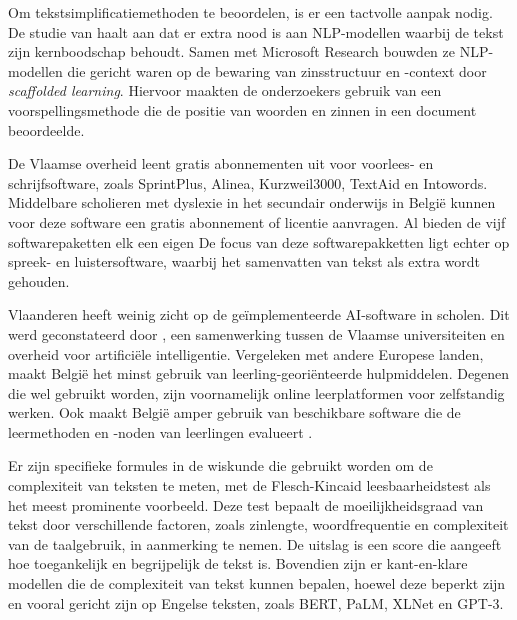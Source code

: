 Om tekstsimplificatiemethoden te beoordelen, is er een tactvolle aanpak nodig. De studie van \textcite{Swayamdipta2019} haalt aan dat er extra nood is aan NLP-modellen waarbij de tekst zijn kernboodschap behoudt. Samen met Microsoft Research bouwden ze NLP-modellen die gericht waren op de bewaring van zinsstructuur en -context door \emph{scaffolded learning}. Hiervoor maakten de onderzoekers gebruik van een voorspellingsmethode die de positie van woorden en zinnen in een document beoordeelde.

De Vlaamse overheid leent gratis abonnementen uit voor voorlees- en schrijfsoftware, zoals SprintPlus, Alinea, Kurzweil3000, TextAid en Intowords. Middelbare scholieren met dyslexie in het secundair onderwijs in België kunnen voor deze software een gratis abonnement of licentie aanvragen. Al bieden de vijf softwarepaketten elk een eigen De focus van deze softwarepakketten ligt echter op spreek- en luistersoftware, waarbij het samenvatten van tekst als extra wordt gehouden.

Vlaanderen heeft weinig zicht op de geïmplementeerde AI-software in scholen. Dit werd geconstateerd door \autocite{Martens2021}, een samenwerking tussen de Vlaamse universiteiten en overheid voor artificiële intelligentie. Vergeleken met andere Europese landen, maakt België het minst gebruik van leerling-georiënteerde hulpmiddelen. Degenen die wel gebruikt worden, zijn voornamelijk online leerplatformen voor zelfstandig werken. Ook maakt België amper gebruik van beschikbare software die de leermethoden en -noden van leerlingen evalueert \autocite{Martens2021a}. 


Er zijn specifieke formules in de wiskunde die gebruikt worden om de complexiteit van teksten te meten, met de Flesch-Kincaid leesbaarheidstest als het meest prominente voorbeeld. Deze test bepaalt de moeilijkheidsgraad van tekst door verschillende factoren, zoals zinlengte, woordfrequentie en complexiteit van de taalgebruik, in aanmerking te nemen. De uitslag is een score die aangeeft hoe toegankelijk en begrijpelijk de tekst is. Bovendien zijn er kant-en-klare modellen die de complexiteit van tekst kunnen bepalen, hoewel deze beperkt zijn en vooral gericht zijn op Engelse teksten, zoals BERT, PaLM, XLNet en GPT-3.

